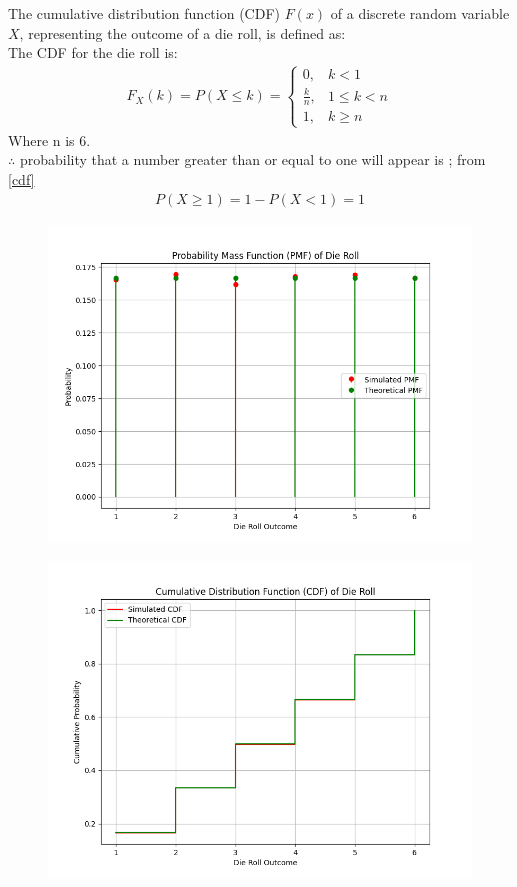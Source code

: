 \documentclass[journal]{IEEEtran}
\begin{document}
	The cumulative distribution function (CDF) \(F(x)\) of a discrete random variable \(X\), representing the outcome of a die roll, is defined as:\\
	The CDF for the die roll is:
	\begin{align}
		F_X(k) = P(X \leq k) =
		\begin{cases}
			0, & k < 1 \\
			\frac{k}{n}, & 1 \leq k < n\\
			1, & k \geq n
		\end{cases} \label{cdf}
	\end{align}
	Where n is 6. \\ 
	$\therefore$ probability that a number greater than or equal to one will
	appear is ; from \eqref{cdf}
	\begin{align}
		P(X \geq 1) = 1 - P(X < 1) = 1
	\end{align} 
	
	\begin{figure}[h!]
		\centering
		\includegraphics[width=\columnwidth]{figs/Fig1.png}
		\label{stemplot}
	\end{figure}
	\begin{figure}[h!]
		\centering
		\includegraphics[width=\columnwidth]{figs/Fig2.png}
		\label{stemplot}
	\end{figure}
	
\end{document}
